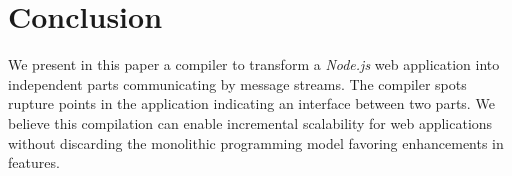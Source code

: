\section{Conclusion} \label{section:conclusion}

We present in this paper a compiler to transform a \textit{Node.js} web application into independent parts communicating by message streams.
The compiler spots rupture points in the application indicating an interface between two parts.
We believe this compilation can enable incremental scalability for web applications without discarding the monolithic programming model favoring enhancements in features.